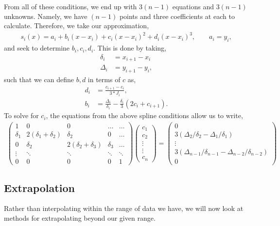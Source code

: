 \documentclass[11pt,a4paper]{report}
\begin{document}
\begin{enumerate}
			From all of these conditions, we end up with $3(n-1)$ equations and $3(n-1)$ unknowns. Namely, we have $(n-1)$ points and three coefficients at each to calculate. Therefore, we take our approximation,
			\begin{align}
				s_i(x) = a_i + b_i(x-x_i) + c_i(x-x_i)^2 + d_i(x-x_i)^3, \qquad a_i = y_i,
			\end{align}
			and seek to determine $b_i,c_i,d_i$. This is done by taking,
			\begin{align}
				\delta_i &= x_{i+1} - x_i \\
				\Delta_i &= y_{i+1} - y_i,
			\end{align}
			such that we can define $b,d$ in terms of $c$ as,
			\begin{align}
				d_i &= \frac{c_{i+1}-c_i}{3*J_i},\\
				b_i &= \frac{\Delta_i}{\delta_i} - \frac{\delta_i}{3} (2c_i+c_{i+1}).
			\end{align}
			To solve for $c_i$, the equations from the above spline conditions allow us to write,
			\begin{align}
			\begin{pmatrix}
				1 		 & 	0 						& 	0 			& \dots & \dots \\
				\delta_1 &	2(\delta_1+\delta_2)	&	\delta_2	& 0		& \dots \\
				0		 &	\delta_2		& 2(\delta_2+\delta_3)	& \delta_3 & \dots \\
				\vdots	 &	\ddots			& \ddots				&\ddots	& \ddots \\
				0		 & 0				& 0						& 0		& 1
			\end{pmatrix} \begin{pmatrix}
			c_1 \\ c_2 \\ \vdots \\ \vdots \\ c_n
			\end{pmatrix} = 
			\begin{pmatrix}
			0 \\ 3 (\Delta_2/\delta_2 - \Delta_1/\delta_1) \\ \vdots \\ 3 (\Delta_{n-1}/\delta_{n-1} - \Delta_{n-2}/\delta_{n-2}) \\ 0
			\end{pmatrix}
			\end{align}
		\end{enumerate}
	
		\subsection{Extrapolation}
			Rather than interpolating within the range of data we have, we will now look at methods for extrapolating beyond our given range.
\end{document}

